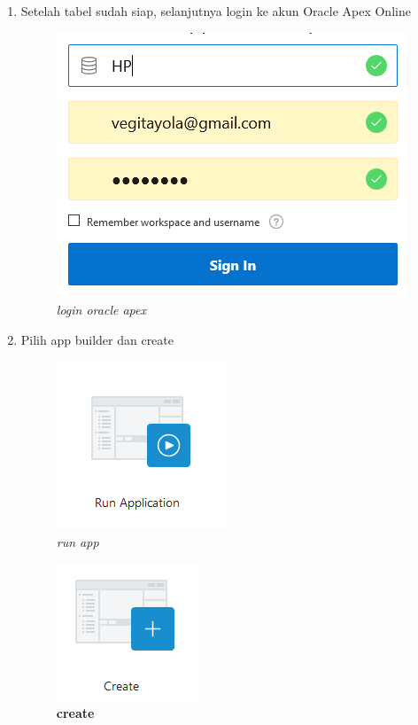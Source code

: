 \begin{enumerate}
    \item Setelah tabel sudah siap, selanjutnya login ke akun Oracle Apex Online
    
    \begin{figure}[!htbp]
        \centering
        \includegraphics[scale=0.5]{figure/login_oracle_apex.PNG}
        \caption{\textit{login oracle apex}}
        \label{fig:my_label}
    \end{figure}
    
    \newpage
    \item Pilih app builder dan create
    
    \begin{figure}[!htbp]
        \centering
        \includegraphics[scale=0.5]{figure/run_app.PNG}
        \caption{\textit{run app}}
        \label{fig:my_label}
    \end{figure}
    
    \begin{figure}[!htbp]
        \centering
        \includegraphics[scale=0.5]{figure/create.PNG}
        \caption{\textbf{create}}
        \label{fig:my_label}
    \end{figure}
    

\end{enumerate}
